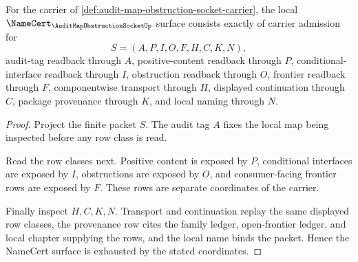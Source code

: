 \begin{theorem}
\label{thm:audit-map-obstruction-socket-namecert-obligations}
For the carrier of \autoref{def:audit-map-obstruction-socket-carrier}, the local $\NameCert_{\AuditMapObstructionSocketUp}$ surface consists exactly of carrier admission for
$$
S=(A,P,I,O,F,H,C,K,N),
$$
audit-tag readback through $A$, positive-content readback through $P$, conditional-interface readback through $I$, obstruction readback through $O$, frontier readback through $F$, componentwise transport through $H$, displayed continuation through $C$, package provenance through $K$, and local naming through $N$.
\end{theorem}
\begin{proof}
Project the finite packet $S$. The audit tag $A$ fixes the local map being inspected before any row class is read.

Read the row classes next. Positive content is exposed by $P$, conditional interfaces are exposed by $I$, obstructions are exposed by $O$, and consumer-facing frontier rows are exposed by $F$. These rows are separate coordinates of the carrier.

Finally inspect $H,C,K,N$. Transport and continuation replay the same displayed row classes, the provenance row cites the family ledger, open-frontier ledger, and local chapter supplying the rows, and the local name binds the packet. Hence the NameCert surface is exhausted by the stated coordinates.
\end{proof}

